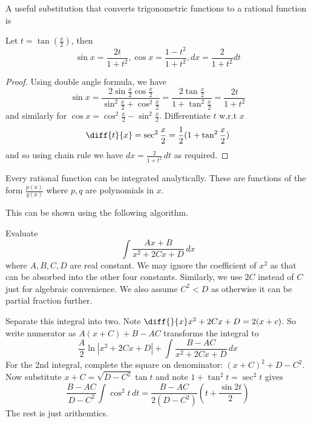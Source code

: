 \documentclass[11pt]{article}
\begin{document}
A useful substitution that converts trigonometric functions to a rational function is 
\begin{proposition}
  Let \(t=\tan(\frac{x}{2})\), then
  \[\sin x=\frac{2t}{1+t^2}, \cos x=\frac{1-t^2}{1+t^2},dx=\frac{2}{1+t^2}dt\]
\end{proposition}
\begin{proof}
  Using double angle formula, we have
  \[\sin x=\frac{2\sin\frac{x}{2}\cos\frac{x}{2}}{\sin^2\frac{x}{2}+\cos^2\frac{x}{2}}=\frac{2\tan\frac{x}{2}}{1+\tan^2\frac{x}{2}}=\frac{2t}{1+t^2}\] and similarly for \(\cos x=\cos^2\frac{x}{2}-\sin^2\frac{x}{2}\).
  Differentiate \(t\) w.r.t \(x\) \[\diff{t}{x}=\sec^2\frac{x}{2}=\frac{1}{2}(1+\tan^2\frac{x}{2})\]
  and so using chain rule we have \(dx=\frac{2}{1+t^2}\,dt\) as required.
\end{proof}

\begin{theorem}
  Every rational function can be integrated analytically. These are functions of the form \(\frac{p(x)}{q(x)}\) where \(p,q\) are polynomials in \(x\).
\end{theorem}

This can be shown using the following algorithm.
\begin{exercise}
  Evaluate \[\int \frac{Ax+B}{x^2+2Cx+D}\,dx\] where \(A,B,C,D\) are real constant. We may ignore the coefficient of \(x^2\) as that can be absorbed into the other four constants. Similarly, we use \(2C\) instead of \(C\) just for algebraic convenience. We also assume \(C^2<D\) as otherwise it can be partial fraction further.
\end{exercise}
\begin{solution}
  Separate this integral into two. Note \(\diff{}{x}x^2+2Cx+D=2(x+c)\). So write numerator as \(A(x+C)+B-AC\) transforms the integral to \[\frac{A}{2}\ln|x^2+2Cx+D|+\int \frac{B-AC}{x^2+2Cx+D}\,dx\]
  For the 2nd integral, complete the square on denominator: \((x+C)^2+D-C^2\). Now substitute \(x+C=\sqrt{D-C^2}\tan t\) and note \(1+\tan^2t=\sec^2t\) gives 
  \[\frac{B-AC}{D-C^2}\int\cos^2t\,dt=\frac{B-AC}{2(D-C^2)}(t+\frac{\sin 2t}{2})\]
  The rest is just arithemtics.
\end{solution}
\end{document}

